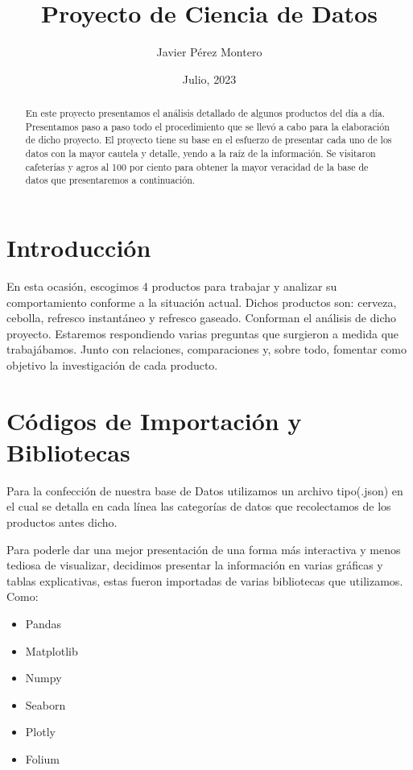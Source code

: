 \documentclass[a4paper,12pt]{article}
\begin{document}
\title{Proyecto de Ciencia de Datos}
\author{Javier Pérez Montero}
\date{Julio, 2023}
\maketitle


\begin{abstract}
    En este proyecto presentamos el análisis detallado de algunos productos del día a día. 
    Presentamos paso a paso todo el procedimiento que se llevó a cabo para la elaboración de dicho proyecto. 
    El proyecto tiene su base en el esfuerzo de presentar cada uno de los datos con la mayor cautela y detalle, yendo a la raíz de la información. 
    Se visitaron cafeterías y agros al 100 por ciento para obtener la mayor veracidad de la base de datos que presentaremos a continuación.


\end{abstract}

\section{Introducción}\label{sec:intro}

En esta ocasión, escogimos 4 productos para trabajar y analizar su comportamiento conforme a la situación actual. 
Dichos productos son: cerveza, cebolla, refresco instantáneo y refresco gaseado. 
Conforman el análisis de dicho proyecto. 
Estaremos respondiendo varias preguntas que surgieron a medida que trabajábamos. 
Junto con relaciones, comparaciones y, sobre todo, fomentar como objetivo la investigación de cada producto.

\section{Códigos de Importación y Bibliotecas}\label{sec:ent}
Para la confección de nuestra base de Datos utilizamos un archivo tipo(.json) en el cual se detalla en cada línea las categorías de datos que recolectamos de los productos antes dicho. 

  Para poderle dar una mejor presentación de una forma más interactiva y menos tediosa de visualizar, decidimos presentar la información en varias gráficas y tablas explicativas, estas fueron importadas de varias bibliotecas que utilizamos.
  Como:
\begin{itemize}
    \item Pandas
    \item Matplotlib
    \item Numpy
    \item Seaborn
    \item Plotly
    \item Folium
\end{itemize}
\end{document}
